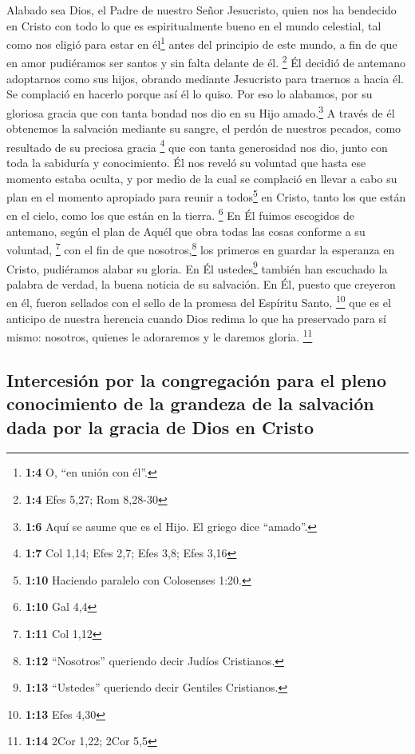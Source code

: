  Alabado sea Dios, el Padre de nuestro Señor Jesucristo,
quien nos ha bendecido en Cristo con todo lo que es espiritualmente
bueno en el mundo celestial,  tal como nos eligió para
estar en él\footnote{\textbf{1:4} O, ``en unión con él''.} antes del
principio de este mundo, a fin de que en amor pudiéramos ser santos y
sin falta delante de él. \footnote{\textbf{1:4} Efes 5,27; Rom 8,28-30}
 Él decidió de antemano adoptarnos como sus hijos, obrando
mediante Jesucristo para traernos a hacia él. Se complació en hacerlo
porque así él lo quiso.  Por eso lo alabamos, por su
gloriosa gracia que con tanta bondad nos dio en su Hijo
amado.\footnote{\textbf{1:6} Aquí se asume que es el Hijo. El griego
  dice ``amado''.}  A través de él obtenemos la salvación
mediante su sangre, el perdón de nuestros pecados, como resultado de su
preciosa gracia \footnote{\textbf{1:7} Col 1,14; Efes 2,7; Efes 3,8;
  Efes 3,16}  que con tanta generosidad nos dio, junto con
toda la sabiduría y conocimiento.  Él nos reveló su
voluntad que hasta ese momento estaba oculta, y por medio de la cual se
complació en llevar a cabo su plan  en el momento
apropiado para reunir a todos\footnote{\textbf{1:10} Haciendo paralelo
  con Colosenses 1:20.} en Cristo, tanto los que están en el cielo, como
los que están en la tierra. \footnote{\textbf{1:10} Gal 4,4}
 En Él fuimos escogidos de antemano, según el plan de
Aquél que obra todas las cosas conforme a su voluntad, \footnote{\textbf{1:11}
  Col 1,12}  con el fin de que nosotros,\footnote{\textbf{1:12}
  ``Nosotros'' queriendo decir Judíos Cristianos.} los primeros en
guardar la esperanza en Cristo, pudiéramos alabar su gloria.
 En Él ustedes\footnote{\textbf{1:13} ``Ustedes''
  queriendo decir Gentiles Cristianos.} también han escuchado la palabra
de verdad, la buena noticia de su salvación. En Él, puesto que creyeron
en él, fueron sellados con el sello de la promesa del Espíritu Santo,
\footnote{\textbf{1:13} Efes 4,30}  que es el anticipo de
nuestra herencia cuando Dios redima lo que ha preservado para sí mismo:
nosotros, quienes le adoraremos y le daremos gloria. \footnote{\textbf{1:14}
  2Cor 1,22; 2Cor 5,5}

\hypertarget{intercesiuxf3n-por-la-congregaciuxf3n-para-el-pleno-conocimiento-de-la-grandeza-de-la-salvaciuxf3n-dada-por-la-gracia-de-dios-en-cristo}{%
\subsection{Intercesión por la congregación para el pleno conocimiento
de la grandeza de la salvación dada por la gracia de Dios en
Cristo}\label{intercesiuxf3n-por-la-congregaciuxf3n-para-el-pleno-conocimiento-de-la-grandeza-de-la-salvaciuxf3n-dada-por-la-gracia-de-dios-en-cristo}}

